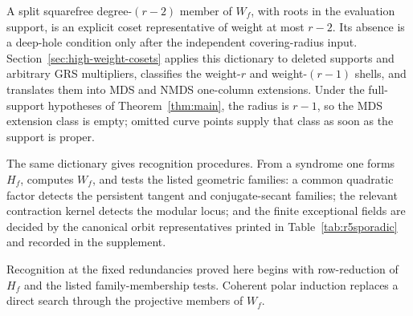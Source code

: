 A split squarefree degree-\((r-2)\) member of \(W_f\), with roots in the
evaluation support, is an explicit coset representative of weight at most
\(r-2\).  Its absence is a deep-hole condition only after the independent
covering-radius input.  Section~\ref{sec:high-weight-cosets} applies this
dictionary to deleted supports and arbitrary GRS multipliers, classifies the
weight-\(r\) and weight-\((r-1)\) shells, and translates them into MDS and NMDS
one-column extensions.  Under the full-support hypotheses of
Theorem~\ref{thm:main}, the radius is \(r-1\), so the MDS extension class is
empty; omitted curve points supply that class as soon as the support is
proper.

The same dictionary gives recognition procedures.  From a syndrome one
forms \(H_f\), computes \(W_f\), and tests the listed geometric families: a
common quadratic factor detects the persistent tangent and conjugate-secant
families; the relevant contraction kernel detects the modular locus; and the
finite exceptional fields are decided by the canonical orbit representatives
printed in Table~\ref{tab:r5sporadic} and recorded in the supplement.

Recognition at the fixed redundancies proved here begins with
row-reduction of \(H_f\) and the listed family-membership tests.
Coherent polar induction replaces a direct search through the
projective members of \(W_f\).
